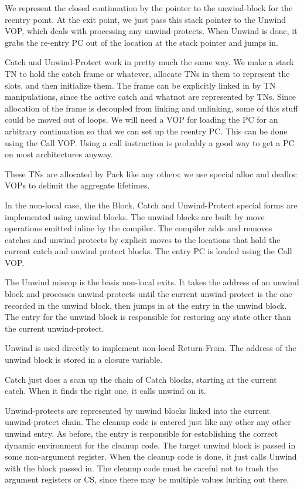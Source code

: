 {\begin{itemize, spread 0, spacing 1}
We represent the closed continuation by the pointer to the unwind-block for the
reentry point.  At the exit point, we just pass this stack pointer to the
Unwind VOP, which deals with processing any unwind-protects.  When Unwind is
done, it grabs the re-entry PC out of the location at the stack pointer and
jumps in.

Catch and Unwind-Protect work in pretty much the same way.  We make a stack TN
to hold the catch frame or whatever, allocate TNs in them to represent the
slots, and then initialize them.  The frame can be explicitly linked in by TN
manipulations, since the active catch and whatnot are represented by TNs.
Since allocation of the frame is decoupled from linking and unlinking, some of
this stuff could be moved out of loops.  We will need a VOP for loading the PC
for an arbitrary continuation so that we can set up the reentry PC.  This can
be done using the Call VOP.  Using a call instruction is probably a good way to
get a PC on most architectures anyway.

These TNs are allocated by Pack like any others; we use special alloc and
dealloc VOPs to delimit the aggregate lifetimes.

In the non-local case, the the Block, Catch and Unwind-Protect special forms
are implemented using unwind blocks.  The unwind blocks are built by move
operations emitted inline by the compiler.  The compiler adds and removes
catches and unwind protects by explicit moves to the locations that hold the
current catch and unwind protect blocks.  The entry PC is loaded using the Call
VOP.

The Unwind miscop is the basis non-local exits.  It takes the address of an
unwind block and processes unwind-protects until the current unwind-protect is
the one recorded in the unwind block, then jumps in at the entry in the unwind
block.  The entry for the unwind block is responsible for restoring any state
other than the current unwind-protect.  

Unwind is used directly to implement non-local Return-From.  The address of the
unwind block is stored in a closure variable.

Catch just does a scan up the chain of Catch blocks, starting at the current
catch.  When it finds the right one, it calls unwind on it.

Unwind-protects are represented by unwind blocks linked into the current
unwind-protect chain.  The cleanup code is entered just like any other any
other unwind entry.  As before, the entry is responsible for establishing the
correct dynamic environment for the cleanup code.  The target unwind block is
passed in some non-argument register.  When the cleanup code is done, it
just calls Unwind with the block passed in.  The cleanup code must be careful
not to trash the argument registers or CS, since there may be multiple values
lurking out there.


\end{itemize, spread 0, spacing 1}}
